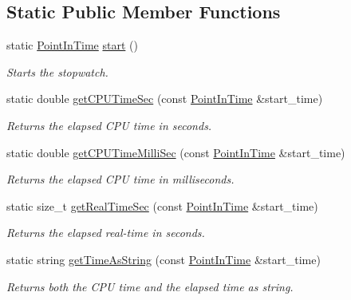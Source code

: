 \subsection*{Static Public Member Functions}
\begin{DoxyCompactItemize}
\item 
static \hyperlink{Stopwatch_8h_af3a9f634f27bed7e98dbc23e5c6f807d}{Point\-In\-Time} \hyperlink{classStopwatch_ae4e530c454d40a88256a76744d3d8a12}{start} ()
\begin{DoxyCompactList}\small\item\em Starts the stopwatch. \end{DoxyCompactList}\item 
static double \hyperlink{classStopwatch_a27dda7191760c2822e3aad879805e013}{get\-C\-P\-U\-Time\-Sec} (const \hyperlink{Stopwatch_8h_af3a9f634f27bed7e98dbc23e5c6f807d}{Point\-In\-Time} \&start\-\_\-time)
\begin{DoxyCompactList}\small\item\em Returns the elapsed C\-P\-U time in seconds. \end{DoxyCompactList}\item 
static double \hyperlink{classStopwatch_a7ba33aa62a14801f379e05e8d4f98d2a}{get\-C\-P\-U\-Time\-Milli\-Sec} (const \hyperlink{Stopwatch_8h_af3a9f634f27bed7e98dbc23e5c6f807d}{Point\-In\-Time} \&start\-\_\-time)
\begin{DoxyCompactList}\small\item\em Returns the elapsed C\-P\-U time in milliseconds. \end{DoxyCompactList}\item 
static size\-\_\-t \hyperlink{classStopwatch_a700dbdfb01479ece147c15d149eba157}{get\-Real\-Time\-Sec} (const \hyperlink{Stopwatch_8h_af3a9f634f27bed7e98dbc23e5c6f807d}{Point\-In\-Time} \&start\-\_\-time)
\begin{DoxyCompactList}\small\item\em Returns the elapsed real-\/time in seconds. \end{DoxyCompactList}\item 
static string \hyperlink{classStopwatch_a4b6869082a043c822dc22944e4c1a5e2}{get\-Time\-As\-String} (const \hyperlink{Stopwatch_8h_af3a9f634f27bed7e98dbc23e5c6f807d}{Point\-In\-Time} \&start\-\_\-time)
\begin{DoxyCompactList}\small\item\em Returns both the C\-P\-U time and the elapsed time as string. \end{DoxyCompactList}\end{DoxyCompactItemize}
